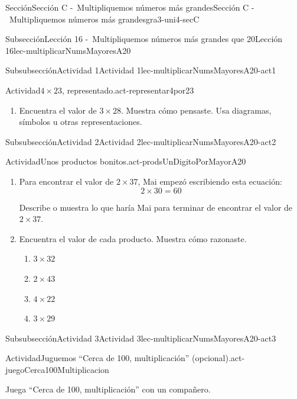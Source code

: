 \documentclass[twoside,10pt,]{article}
\begin{document}
\begin{sectionptx}{Sección}{Sección C -~Multipliquemos números más grandes}{}{Sección C -~Multipliquemos números más grandes}{}{}{gra3-uni4-secC}
\begin{subsectionptx}{Subsección}{Lección 16 -~Multipliquemos números más grandes que 20}{}{Lección 16}{}{}{lec-multiplicarNumsMayoresA20}
\begin{subsubsectionptx}{Subsubsección}{Actividad 1}{}{Actividad 1}{}{}{lec-multiplicarNumsMayoresA20-act1}
\begin{activity}{Actividad}{\(4\times 23\), representado.}{act-representar4por23}
\begin{enumerate}
\begin{enumerate}
\end{enumerate}
\item{}Encuentra el valor de \(3\times 28\). Muestra cómo pensaste. Usa diagramas, símbolos u otras representaciones.%
\end{enumerate}
\end{activity}%
\end{subsubsectionptx}
%
%
\typeout{************************************************}
\typeout{************************************************}
%
\begin{subsubsectionptx}{Subsubsección}{Actividad 2}{}{Actividad 2}{}{}{lec-multiplicarNumsMayoresA20-act2}
\begin{activity}{Actividad}{Unos productos bonitos.}{act-prodsUnDigitoPorMayorA20}%
%
\begin{enumerate}
\item{}Para encontrar el valor de \(2\times 37\), Mai empezó escribiendo esta ecuación:%
\begin{equation*}
2 \times 30 = 60
\end{equation*}
%
\par
Describe o muestra lo que haría Mai para terminar de encontrar el valor de \(2\times 37\).%
\item{}Encuentra el valor de cada producto. Muestra cómo razonaste.%
%
\begin{enumerate}
\item{}\(\displaystyle 3\times 32\)%
\item{}\(\displaystyle 2\times 43\)%
\item{}\(\displaystyle 4\times 22\)%
\item{}\(\displaystyle 3\times 29\)%
\end{enumerate}
\end{enumerate}
\end{activity}%
\end{subsubsectionptx}
%
%
\typeout{************************************************}
\typeout{************************************************}
%
\begin{subsubsectionptx}{Subsubsección}{Actividad 3}{}{Actividad 3}{}{}{lec-multiplicarNumsMayoresA20-act3}
\begin{activity}{Actividad}{Juguemos “Cerca de 100, multiplicación” (opcional).}{act-juegoCerca100Multiplicacion}%
\begin{sidebyside}{2}{0.05}{0.05}{0.1}%
\begin{sbspanel}{0.5}%
Juega “Cerca de 100, multiplicación” con un compañero.%

\end{sbspanel}
\end{sidebyside}
\end{activity}
\end{subsubsectionptx}
\end{subsectionptx}
\end{sectionptx}
\end{document}
